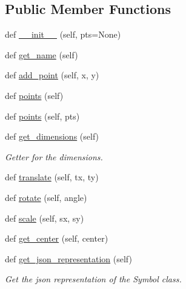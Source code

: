\subsection*{Public Member Functions}
\begin{DoxyCompactItemize}
\item 
def \mbox{\hyperlink{classbridges_1_1polyline_1_1_polyline_a536cf599bc221283c8e8d6df2324f23e}{\+\_\+\+\_\+init\+\_\+\+\_\+}} (self, pts=None)
\item 
def \mbox{\hyperlink{classbridges_1_1polyline_1_1_polyline_ac29d5a9cfe5fd60d97a32adef3a6b6bc}{get\+\_\+name}} (self)
\item 
def \mbox{\hyperlink{classbridges_1_1polyline_1_1_polyline_a0afbd2327d8dcba63809a6be07704753}{add\+\_\+point}} (self, x, y)
\item 
def \mbox{\hyperlink{classbridges_1_1polyline_1_1_polyline_ad1671a5857ad9e4010b7783b472c83fa}{points}} (self)
\item 
def \mbox{\hyperlink{classbridges_1_1polyline_1_1_polyline_ad543fcb38cb561b71d2ae2a9a88d9888}{points}} (self, pts)
\item 
def \mbox{\hyperlink{classbridges_1_1polyline_1_1_polyline_abc460c0169e1251e572642f8e968df05}{get\+\_\+dimensions}} (self)
\begin{DoxyCompactList}\small\item\em Getter for the dimensions. \end{DoxyCompactList}\item 
def \mbox{\hyperlink{classbridges_1_1polyline_1_1_polyline_a654226c0de86aa0c6b9b5181a552cbfe}{translate}} (self, tx, ty)
\item 
def \mbox{\hyperlink{classbridges_1_1polyline_1_1_polyline_ab72d0a3cfdc4c3a7efec194f54f8a14a}{rotate}} (self, angle)
\item 
def \mbox{\hyperlink{classbridges_1_1polyline_1_1_polyline_a2727d3d6fa9da5ea738c51f822da16ae}{scale}} (self, sx, sy)
\item 
def \mbox{\hyperlink{classbridges_1_1polyline_1_1_polyline_a381cd78da11db3ce98fa87acd1d57449}{get\+\_\+center}} (self, center)
\item 
def \mbox{\hyperlink{classbridges_1_1polyline_1_1_polyline_a7f99e9e20c90068713b54ad64df3f193}{get\+\_\+json\+\_\+representation}} (self)
\begin{DoxyCompactList}\small\item\em Get the json representation of the Symbol class. \end{DoxyCompactList}\end{DoxyCompactItemize}


